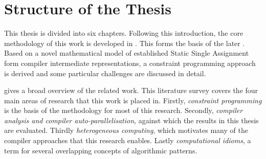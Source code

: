 



\newpage
\phantom{placeholder}
\newpage

\section{Structure of the Thesis}

    This thesis is divided into six chapters.
    Following this introduction, the core methodology of this work is developed
    in {\bf{}}.
    This forms the basis of the later
    {\bf{}}.
    Based on a novel mathematical model of established Static Single Assignment
    form compiler intermediate representations, a constraint programming
    approach is derived and some particular challenges are discussed in detail.

    {\bf{}} gives a broad overview of the related work.
    This literature survey covers the four main areas of research that this work
    is placed in.
    Firstly, {\em constraint programming} is the basis of the methodology for
    most of this research.
    Secondly, {\em compiler analysis and compiler auto-parallelisation}, against
    which the results in this thesis are evaluated.
    Thirdly {\em heterogeneous computing}, which motivates many of the compiler
    approaches that this research enables.
    Lastly {\em computational idioms}, a term for several overlapping concepts
    of algorithmic patterns.

